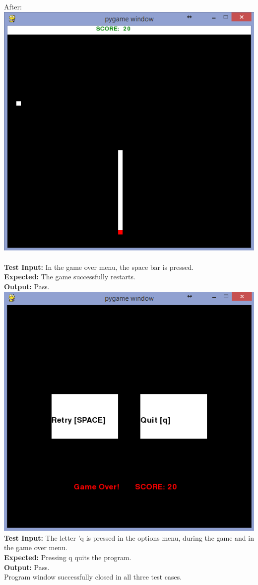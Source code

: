 \documentclass[12pt]{article}
\begin{document}
After: \pagebreak\includegraphics[width=\textwidth]{crash.png}\\
\\
\textbf{Test Input:} In the game over menu, the space bar is pressed.\\
\textbf{Expected:} The game successfully restarts.\\
\textbf{Output:}  Pass.\\
\pagebreak
\includegraphics[width=\textwidth]{restart.png}
\\
\textbf{Test Input:} The letter 'q is pressed in the options menu, during the game and in the game over menu. \\
\textbf{Expected:} Pressing q quits the program.\\
\textbf{Output:} Pass.\\
Program window successfully closed in all three test cases.\\
\end{document}
